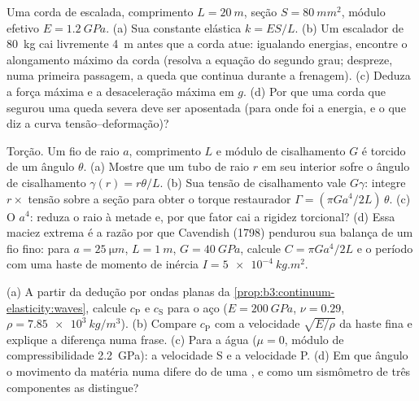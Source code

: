 \begin{exercise}[$\star\star$]\label{exo:b3:continuum-elasticity:7}
Uma corda de escalada, comprimento $L = \qty{20}{m}$, seção $S =
\qty{80}{mm^2}$, módulo efetivo $E = \qty{1.2}{GPa}$. (a) Sua
constante elástica $k = ES/L$. (b) Um escalador de \qty{80}{kg} cai
livremente \qty{4}{m} antes que a corda atue: igualando energias,
encontre o alongamento máximo da corda (resolva a equação do segundo
grau; despreze, numa primeira passagem, a queda que continua durante a
frenagem). (c) Deduza a força máxima e a desaceleração máxima em $g$.
(d) Por que uma corda que segurou uma queda severa deve ser aposentada
(para onde foi a energia, e o que diz a curva tensão--deformação)?
\end{exercise}

\begin{exercise}[$\star\star$]\label{exo:b3:continuum-elasticity:8}
Torção. Um fio de raio $a$, comprimento $L$ e módulo de cisalhamento
$G$ é torcido de um ângulo $\theta$. (a) Mostre que um tubo de raio $r$
em seu interior sofre o ângulo de cisalhamento $\gamma(r) = r\theta/L$.
(b) Sua tensão de cisalhamento vale $G\gamma$: integre $r \times$
tensão sobre a seção para obter o torque restaurador
$\Gamma = (\pi Ga^4/2L)\,\theta$. (c) O $a^4$: reduza o raio à metade
e, por que fator cai a rigidez torcional? (d) Essa maciez extrema é a
razão por que Cavendish (1798) pendurou sua balança de um fio fino:
para $a = \qty{25}{\micro m}$, $L =
\qty{1}{m}$, $G = \qty{40}{GPa}$, calcule $C = \pi Ga^4/2L$ e o
período com uma haste de momento de inércia $I = \qty{5e-4}{kg.m^2}$.
\end{exercise}

\begin{exercise}[$\star\star$]\label{exo:b3:continuum-elasticity:9}
(a) A partir da dedução por ondas planas da
\cref{prop:b3:continuum-elasticity:waves}, calcule $c_{\text{P}}$ e
$c_{\text{S}}$ para o aço ($E = \qty{200}{GPa}$, $\nu = 0.29$, $\rho =
\qty{7.85e3}{kg/m^3}$). (b) Compare $c_{\text{P}}$ com a velocidade
$\sqrt{E/\rho}$ da haste fina e explique a diferença numa frase. (c)
Para a água ($\mu = 0$, módulo de compressibilidade \qty{2.2}{GPa}): a
velocidade S e a velocidade P. (d) Em que ângulo o movimento da
matéria numa  difere do de uma , e como um sismômetro de
três componentes as distingue?
\end{exercise}

